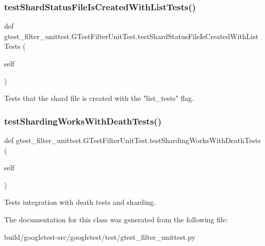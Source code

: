 \subsubsection{\texorpdfstring{test\+Shard\+Status\+File\+Is\+Created\+With\+List\+Tests()}{testShardStatusFileIsCreatedWithListTests()}}
{\footnotesize\ttfamily def gtest\+\_\+filter\+\_\+unittest.\+G\+Test\+Filter\+Unit\+Test.\+test\+Shard\+Status\+File\+Is\+Created\+With\+List\+Tests (\begin{DoxyParamCaption}\item[{}]{self }\end{DoxyParamCaption})}

\begin{DoxyVerb}Tests that the shard file is created with the "list_tests" flag.\end{DoxyVerb}
 \mbox{\label{classgtest__filter__unittest_1_1GTestFilterUnitTest_a4b4f7428d9219dff5960968477927626}} 
\subsubsection{\texorpdfstring{test\+Sharding\+Works\+With\+Death\+Tests()}{testShardingWorksWithDeathTests()}}
{\footnotesize\ttfamily def gtest\+\_\+filter\+\_\+unittest.\+G\+Test\+Filter\+Unit\+Test.\+test\+Sharding\+Works\+With\+Death\+Tests (\begin{DoxyParamCaption}\item[{}]{self }\end{DoxyParamCaption})}

\begin{DoxyVerb}Tests integration with death tests and sharding.\end{DoxyVerb}
 

The documentation for this class was generated from the following file\+:\begin{DoxyCompactItemize}
\item 
build/googletest-\/src/googletest/test/gtest\+\_\+filter\+\_\+unittest.\+py\end{DoxyCompactItemize}

